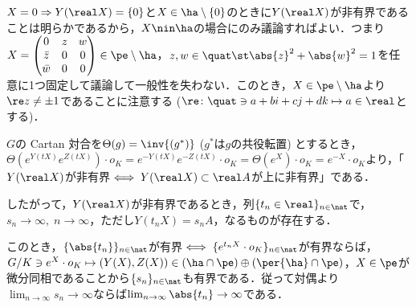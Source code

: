 \begin{pfwn}{}
  
  $X = 0\Rightarrow Y(\real X) = \{0\} $と$X\in \ha\setminus\{0\} $のときに$Y(\real X) $が非有界であることは明らかであるから，$X\nin \ha $の場合にのみ議論すればよい．つまり
  $X =
  \begin{pmatrix}
    0 & z & w \\
    \bar{z} & 0 & 0 \\
    \bar{w} & 0 & 0 
  \end{pmatrix}
  \in \pe\setminus\ha $，$z,w\in \quat \st \abs{z}^2 +\abs{w}^2  = 1 $を任意に1つ固定して議論して一般性を失わない．このとき，$X\in\pe\setminus \ha $より$\re z \neq \pm 1$であることに注意する ($\re\colon \quat\ni a+bi+cj+dk\mapsto a\in \real$とする)．

  $G$の Cartan 対合を$\Theta(g) = \inv{(g^{*})} $ ($g^{*}$は$g$の共役転置) とするとき，$\Theta(e^{Y(tX)}e^{Z(tX)})\cdot o_K = e^{-Y(tX)}e^{-Z(tX)}\cdot o_K = \Theta(e^{X})\cdot o_K = e^{-X}\cdot o_K $より，「$Y(\real X) $が非有界$\iff Y(\real X)\subset \real A $が上に非有界」である．

  したがって，$Y (\real X) $が非有界であるとき，列$\{t_n \in \real \}_{n\in \nat} $で，$s_n\to \infty,\; n\to \infty$，ただし$Y(t_n X) = s_nA$，なるものが存在する．

  このとき，$\{\abs{t_n}\}_{n\in \nat}$が有界$\iff \{e^{t_n X}\cdot o_K\}_{n\in \nat}  $が有界ならば，$G/K\ni e^{X}\cdot o_K\mapsto (Y(X), Z(X))\in (\ha\cap \pe)\oplus (\per{\ha}\cap \pe) $，$X\in \pe$が微分同相であることから$\{s_n\}_{n\in \nat} $も有界である．従って対偶より$\lim_{n\to\infty}s_n\to \infty $ならば$\lim_{n\to \infty}\abs{t_n}\to \infty $である．


\end{pfwn}
